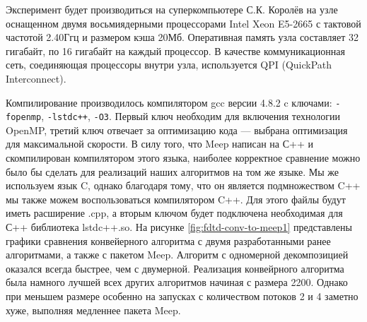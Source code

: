 \documentclass[14pt,a4paper]{extarticle} %
\begin{document}
Эксперимент будет производиться на суперкомпьютере С.К. Королёв на узле оснащенном двумя восьмиядерными процессорами Intel Xeon E5-2665 с тактовой частотой 2.40Ггц и размером кэша 20Мб.  Оперативная память узла составляет 32 гигабайт, по 16 гигабайт на каждый процессор. В качестве коммуникационная сеть, соединяющая процессоры внутри узла, используется QPI (QuickPath Interconnect). 

Компилирование производилось компилятором gcc версии 4.8.2 c ключами: \texttt{-fopenmp}, \texttt{-lstdc++}, \texttt{-O3}. Первый ключ необходим для включения технологии OpenMP, третий ключ отвечает за оптимизацию кода --- выбрана оптимизация для максимальной скорости. В силу того, что Meep написан на С++ и скомпилирован компилятором этого языка, наиболее корректное сравнение можно было бы сделать для реализаций наших алгоритмов на том же языке. Мы же используем язык C, однако благодаря тому, что он является подмножеством C++ мы также можем воспользоваться компилятором C++. Для этого файлы будут иметь расширение .cpp, а вторым ключом будет подключена необходимая для С++ библиотека lstdc++.so.  
На рисунке \ref{fig:fdtd-conv-to-meep1} представлены графики сравнения конвейерного алгоритма с двумя разработанными ранее алгоритмами, а также с пакетом Meep. Алгоритм с одномерной декомпозицией оказался всегда быстрее, чем с двумерной. Реализация конвейрного алгоритма была намного лучшей всех других алгоритмов начиная с размера 2200. Однако при меньшем размере особенно на запусках с количеством потоков 2 и 4 заметно хуже, выполняя медленнее пакета Meep. 
\end{document}
